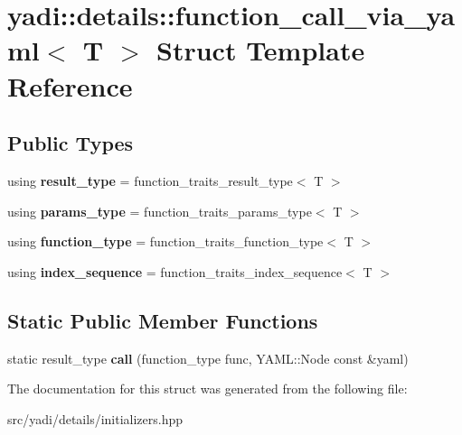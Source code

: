 \hypertarget{structyadi_1_1details_1_1function__call__via__yaml}{}\section{yadi\+:\+:details\+:\+:function\+\_\+call\+\_\+via\+\_\+yaml$<$ T $>$ Struct Template Reference}
\label{structyadi_1_1details_1_1function__call__via__yaml}
\subsection*{Public Types}
\begin{DoxyCompactItemize}
\item 
\mbox{\label{structyadi_1_1details_1_1function__call__via__yaml_afaa3b21dcbc0e1a15738d1b6d2aa01d0}} 
using {\bfseries result\+\_\+type} = function\+\_\+traits\+\_\+result\+\_\+type$<$ T $>$
\item 
\mbox{\label{structyadi_1_1details_1_1function__call__via__yaml_a2e36b4fa05d0394972a9f45f06d7ab05}} 
using {\bfseries params\+\_\+type} = function\+\_\+traits\+\_\+params\+\_\+type$<$ T $>$
\item 
\mbox{\label{structyadi_1_1details_1_1function__call__via__yaml_a81a291cb5024c27cd93a3853b47a265b}} 
using {\bfseries function\+\_\+type} = function\+\_\+traits\+\_\+function\+\_\+type$<$ T $>$
\item 
\mbox{\label{structyadi_1_1details_1_1function__call__via__yaml_a63df821b6a02c14851dabbddd3dd18a0}} 
using {\bfseries index\+\_\+sequence} = function\+\_\+traits\+\_\+index\+\_\+sequence$<$ T $>$
\end{DoxyCompactItemize}
\subsection*{Static Public Member Functions}
\begin{DoxyCompactItemize}
\item 
\mbox{\label{structyadi_1_1details_1_1function__call__via__yaml_a811aa6a0b4643bbf95384e108635e459}} 
static result\+\_\+type {\bfseries call} (function\+\_\+type func, Y\+A\+M\+L\+::\+Node const \&yaml)
\end{DoxyCompactItemize}


The documentation for this struct was generated from the following file\+:\begin{DoxyCompactItemize}
\item 
src/yadi/details/initializers.\+hpp\end{DoxyCompactItemize}
